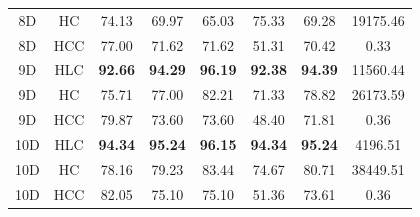 \begin{table}[htbp]
{\begin{tabular}{|c|c|c|c|c|c|c|c|}
8D & HC & 74.13 & 69.97 & 65.03 & 75.33 & 69.28 & 19175.46 \\
8D & HCC & 77.00 & 71.62 & 71.62 & 51.31 & 70.42 & 0.33 \\
\hline
9D & HLC & \textbf{92.66} & \textbf{94.29} & \textbf{96.19} & \textbf{92.38} & \textbf{94.39} & 11560.44 \\
9D & HC & 75.71 & 77.00 & 82.21 & 71.33 & 78.82 & 26173.59 \\
9D & HCC & 79.87 & 73.60 & 73.60 & 48.40 & 71.81 & 0.36 \\
\hline
10D & HLC & \textbf{94.34} & \textbf{95.24} & \textbf{96.15} & \textbf{94.34} & \textbf{95.24} & 4196.51 \\
10D & HC & 78.16 & 79.23 & 83.44 & 74.67 & 80.71 & 38449.51 \\
10D & HCC & 82.05 & 75.10 & 75.10 & 51.36 & 73.61 & 0.36 \\
\hline
\end{tabular}
}%
\end{table}


